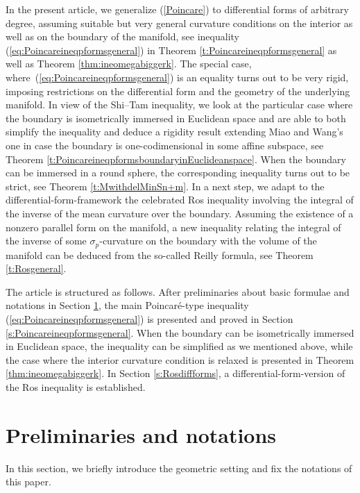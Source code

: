 \documentclass[pdftex]{sigma}
\numberwithin{equation}{section}
\begin{document}
In the present article, we generalize (\ref{Poincare}) to differential forms of arbitrary degree, assuming  suitable but very general curvature conditions on the interior as well as on the boundary of the manifold, see i\-ne\-qua\-li\-ty (\ref{eq:Poincareineqpformsgeneral}) in Theorem \ref{t:Poincareineqpformsgeneral} as well as Theorem \ref{thm:ineomegabiggerk}.
The special case, where~(\ref{eq:Poincareineqpformsgeneral}) is an equality turns out to be very rigid, imposing restrictions on the differential form and the geometry of the underlying manifold.
In view of the Shi--Tam i\-ne\-qua\-li\-ty, we look at the particular case where the boundary is isometrically immersed in Euclidean space and are able to both simplify the i\-ne\-qua\-li\-ty and deduce a rigidity result extending Miao and Wang's one in case the boundary is one-codimensional in some affine subspace, see Theorem \ref{t:PoincareineqpformsboundaryinEuclideanspace}.
When the boundary can be immersed in a round sphere, the corresponding i\-ne\-qua\-li\-ty turns out to be strict, see Theo\-rem \ref{t:MwithdelMinSn+m}.
In a next step, we adapt to the differential-form-framework the celebrated Ros i\-ne\-qua\-li\-ty \cite[Theorem 1]{Ros87} involving the integral of the inverse of the mean curvature over the boundary.
Assuming the existence of a nonzero parallel form on the manifold, a new i\-ne\-qua\-li\-ty relating the integral of the inverse of some $\sigma_p$-curvature on the boundary with the volume of the manifold can be deduced from the so-called Reilly formula, see Theorem \ref{t:Rosgeneral}.

The article is structured as follows.
After preliminaries about basic formulae and notations in Section \ref{s:prelim}, the main Poincar\'e-type i\-ne\-qua\-li\-ty (\ref{eq:Poincareineqpformsgeneral}) is presented and proved in Section \ref{s:Poincareineqpformsgeneral}.
When the boundary can be isometrically immersed in Euclidean space, the i\-ne\-qua\-li\-ty can be simplified as we mentioned above, while the case where the interior curvature condition is relaxed is presented in Theorem \ref{thm:ineomegabiggerk}.
In Section \ref{s:Rosdiffforms}, a differential-form-version of the Ros i\-ne\-qua\-li\-ty is established.


\section{Preliminaries and notations}\label{s:prelim}

In this section, we briefly introduce the geometric setting and fix the notations of this paper.
\end{document}
